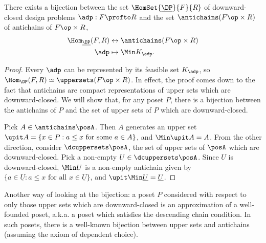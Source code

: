 \begin{lemma}
    There exists a bijection between the set $\HomSet{\underline{\DP}}{F}{R}$ of downward-closed design problems $\adp : F \profto R$ and the set $\antichains (F\op \times R)$ of antichains of $F\op \times R$, %
    \begin{equation}
        \begin{aligned}
            \Hom_{\underline{\DP}}(F,R) &\leftrightarrow \antichains (F\op \times R) \\
            \adp &\mapsto \Min K_\adp.
        \end{aligned}
    \end{equation}
\end{lemma}
\begin{proof}
    Every $\adp$ can be represented by its feasible set $K_\adp$, so $\Hom_\DP(F,R) \simeq \uppersets (F\op \times R)$. In effect, the proof comes down to the fact that antichains are compact representations of upper sets which are downward-closed. We will show that, for any poset $P$, there is a bijection between the antichains of $P$ and the set of upper sets of $P$ which are downward-closed.

    Pick $A \in \antichains\posA$. Then $A$ generates an upper set $\upit A = \{ x \in P : a \leq x \text{ for some $a \in A$} \}$, and $\Min \upit A = A$. From the other direction, consider $\dcuppersets \posA$, the set of upper sets of $\posA$ which are downward-closed. Pick a non-empty $U \in \dcuppersets \posA$. Since $U$ is downward-closed, $\Min U$ is a non-empty antichain given by $\{ a \in \underline{U} : a \leq x \text{ for all $x \in \underline{U}$} \}$, and $\upit \Min \underline{U} = \underline{U}$.
\end{proof}

\begin{remark}
    Another way of looking at the bijection: a poset $P$ considered with respect to only those upper sets which are downward-closed is an approximation of a well-founded poset, a.k.a. a poset which satisfies the descending chain condition. In such posets, there is a well-known bijection between upper sets and antichains (assuming the axiom of dependent choice).
\end{remark}

 

